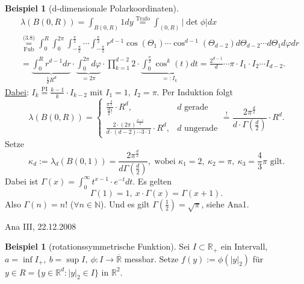 \documentclass[a4paper]{report}
\newcommand{\R}{\mathbb{R}}
\newcommand{\Rq}{\overline{\R}}
\newcommand{\N}{\mathbb{N}}
\newcommand{\jlabel}[1]{\label{j_#1}}
\newcommand{\jshortlink}[1]{\jhyperref{#1}{\text{#1}}}
\newcommand{\jhyperref}[2]{\hyperref[j_#1]{#2}}
\newcommand{\jabb}[3]{ #1: #2 \rightarrow #3 }
\newcommand{\jshortlinkFubini}{\jhyperref{Fubini}{\text{Fub}}}
\newcommand{\jspacesmall}{\vspace{4pt}}
\newcommand{\jdate}[1]{\jspacesmall\begin{center}\jlabel{#1}\tiny{Ana III, #1}\end{center}}
\theoremstyle{plain}
\theoremstyle{definition}
\newtheorem{expl}[thm]{Beispiel}
\begin{document}
{{{{\begin{expl}[d-dimensionale Polarkoordinaten]
    \[
        \begin{split}
            &\lambda(B(0,R)) = \int_{B(0,R)} 1 dy \overset{\jshortlink{Trafo}}{=} \int_{(0,R)} |\det \phi| dx\\
            &\underset{\jshortlinkFubini}{\overset{\jshortlink{(3.8)}}{=}} \int_0^R\int_0^{2\pi}\int_{-\frac{\pi}{2}}^{\frac{\pi}{2}} \cdots \int_{-\frac{\pi}{2}}^{\frac{\pi}{2}} r^{d-1} \cos(\Theta_1) \cdots \cos^{d-1}(\Theta_{d-2})d\Theta_{d-2}\cdots d\Theta_1 d\varphi dr\\
            &= \underbrace{\int_0^R r^{d-1}dr}_{\frac{1}{d} R^d}\cdot \underbrace{\int_0^{2\pi} d\varphi}_{= 2\pi} \cdot \prod_{k=1}^{d-2}2\cdot \underbrace{\int_0^{\frac{\pi}{2}} \cos^k(t)dt}_{=:I_k} = \frac{2^{d-1}}{d} \cdots \pi \cdot I_1\cdot I_2\cdots I_{d-2}.
        \end{split}
    \]
    \uline{Dabei}: $I_k \overset{\text{PI}}{=} \frac{k-1}{k} \cdot I_{k-2}$ mit $I_1 = 1,\ I_2 = \pi$. Per Induktion folgt
    \[
        \lambda(B(0,R)) = \begin{cases}
                              \frac{\pi^{\frac{d}{2}}}{\frac{d}{2}!}\cdot R^d, &d \text{ gerade}\\
                              \frac{2\cdot(2\pi)^{\frac{d-1}{2}}}{d\cdot(d-2)\cdots 3 \cdot 1}\cdot R^d, &d \text{ ungerade}
                          \end{cases}
                        \overset{!}{=} \frac{2\pi^{\frac{d}{2}}}{d\cdot\Gamma(\frac{d}{2})}\cdot R^d.
    \]
    Setze
    \begin{equation}
        \jlabel{(3.9)}
        \kappa_d := \lambda_d(B(0,1)) = \frac{2\pi^{\frac{d}{2}}}{d\Gamma(\frac{d}{2})}, \text{ wobei } \kappa_1 = 2, \ \kappa_2 = \pi, \ \kappa_3 = \frac{4}{3}\pi \text{ gilt}.
    \end{equation}
    Dabei ist $\Gamma(x) = \int_0^\infty t^{x-1}\cdot e^{-t}dt$. Es gelten
    \begin{equation}
        \jlabel{(3.10)}
        \Gamma(1)=1, \ x\cdot \Gamma(x) = \Gamma(x+1).
    \end{equation}
    Also $\Gamma(n) = n!$ ($\forall n\in\N$). Und es gilt $\Gamma(\frac{1}{2}) = \sqrt{\pi}$, siehe Ana1.
\end{expl}

\jdate{22.12.2008}

\begin{expl}[rotationssymmetrische Funktion]
    \jlabel{Bsp 3.36}
    Sei $I\subset \R_+$ ein Intervall, $a=\inf I_+,\ b = \sup I, \ \jabb{\phi}{I}{\Rq}$ messbar. Setze $f(y):= \phi(|y|_2)$ für $y \in R = \{y\in\R^d : |y|_2 \in I\}$ in $\R^2$.
    

\end{expl}}}}}
\end{document}
